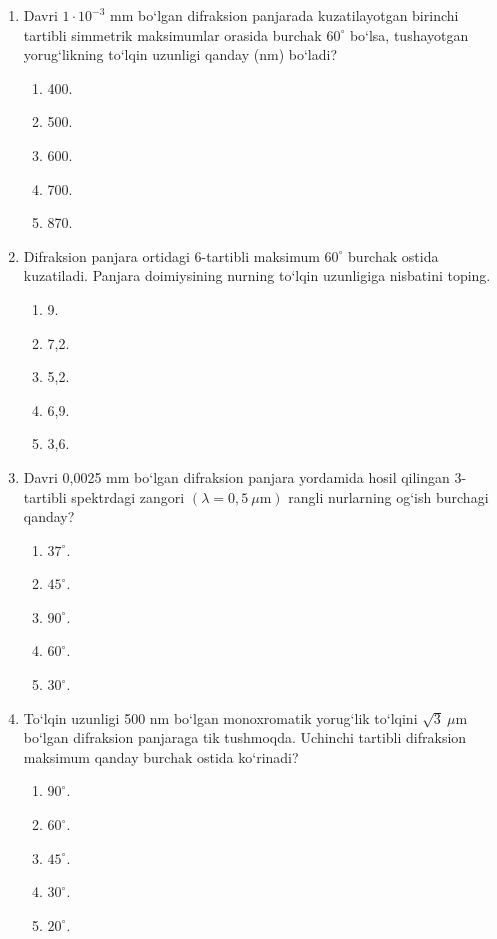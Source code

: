 \begin{enumerate}
\item Davri $1\cdot10^{-3}$ mm bo‘lgan difraksion panjarada kuzatilayotgan birinchi tartibli simmetrik maksimumlar orasida burchak $60^\circ$ bo‘lsa, tushayotgan yorug‘likning to‘lqin uzunligi qanday (nm) bo‘ladi?
\begin{enumerate}[label=\Alph*)]
\item 400.
\item 500.
\item 600.
\item 700.
\item 870.
\end{enumerate}

\item Difraksion panjara ortidagi 6-tartibli maksimum $60^\circ$ burchak ostida kuzatiladi. Panjara doimiysining nurning to‘lqin uzunligiga nisbatini toping.
\begin{enumerate}[label=\Alph*)]
\item 9.
\item 7,2.
\item 5,2.
\item 6,9.
\item 3,6.
\end{enumerate}

\item Davri 0,0025 mm bo‘lgan difraksion panjara yordamida hosil qilingan 3-tartibli spektrdagi zangori $(\lambda=0{,}5~\mu\text{m})$ rangli nurlarning og‘ish burchagi qanday?
\begin{enumerate}[label=\Alph*)]
\item $37^\circ$.
\item $45^\circ$.
\item $90^\circ$.
\item $60^\circ$.
\item $30^\circ$.
\end{enumerate}

\item To‘lqin uzunligi 500 nm bo‘lgan monoxromatik yorug‘lik to‘lqini $\sqrt3~\mu$m bo‘lgan difraksion panjaraga tik tushmoqda. Uchinchi tartibli difraksion maksimum qanday burchak ostida ko‘rinadi?
\begin{enumerate}[label=\Alph*)]
\item $90^\circ$.
\item $60^\circ$.
\item $45^\circ$.
\item $30^\circ$.
\item $20^\circ$.
\end{enumerate}










\end{enumerate}
